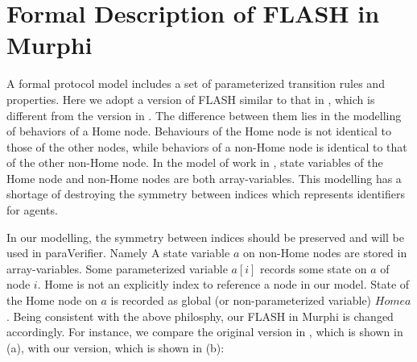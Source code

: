 \documentclass{llncs}
\begin{document}




\section{Formal Description of FLASH in Murphi\label{sec:formalDescription}}
A formal protocol model includes a set of parameterized transition rules and properties.  Here we adopt a version of FLASH similar to that in \cite{cubeicBeyond}, which is different from the version in \cite{Chou2004}. The difference between them lies in the modelling of behaviors of a Home node. Behaviours of the Home node is not identical to those of the other nodes, while behaviors of
 a non-Home node is identical to that of the other non-Home node. In the model of work in \cite{Chou2004}, state variables of the Home node and non-Home nodes are both array-variables. This modelling has a shortage of destroying the symmetry between indices which represents identifiers for agents.

In our modelling, the symmetry between indices should be preserved and will be used in {\sf paraVerifier}. Namely  A  state variable $a$ on non-Home nodes are stored in array-variables. Some parameterized variable $a[i]$ records some state on $a$ of node $i$. Home is not an explicitly index to reference a node in our model. State of
 the Home node on $a$ is recorded as global  (or non-parameterized variable) $Homea$. %
 Being consistent with the above philosphy, our FLASH in Murphi is changed accordingly. For instance, we compare the original version in \cite{Chou2004}, which is shown in (a), with our version, which is shown in (b):
\end{document}
